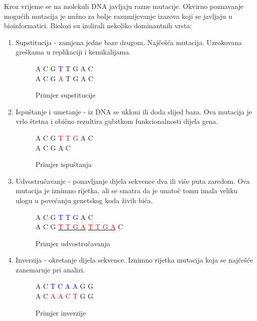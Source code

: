 \documentclass[times, utf8, diplomski]{fer}
\begin{document}
Kroz vrijeme se na molekuli DNA javljaju razne mutacije. Okvirno poznavanje mogućih mutacija je nužno za bolje razumijevanje izazova koji se javljaju u bioinformatici. Biolozi su izolirali nekoliko dominantnih vrsta:

\begin{enumerate}
\item Supstitucija - zamjena jedne baze drugom. Najčešća mutacija.
  Uzrokovana greškama u replikaciji i kemikalijama.
  \nopagebreak
  \begin{figure}[!ht]
    \begin{center}
      A C G \textcolor{blue}{T} T G A C \\
      A C G \textcolor{red}{A} T G A C
      \caption{Primjer supstitucije}
    \end{center}
  \end{figure}

\item Ispuštanje i umetanje - iz DNA se ukloni ili doda slijed baza. Ova mutacija je vrlo štetna i obično
  rezultira gubitkom funkcionalnosti dijela gena.

  \nopagebreak
  \begin{figure}[!ht]
    \begin{center}
      A C G \textcolor{red}{T T G} A C \\
      A C G A C
      \caption{Primjer ispuštanja}
    \end{center}
  \end{figure}
\item Udvostručavanje - ponavljanje dijela sekvence dva ili više puta zaredom. Ova mutacija je iznimno rijetka,
  ali se smatra da je unatoč tomu imala veliku ulogu u povećanju genetskog koda živih bića.
  \begin{figure}[!ht]
    \begin{center}
      A C G \textcolor{blue}{T T G A} C \\
      A C G \underline{\textcolor{red}{T T G A}} \underline{\textcolor{red}{T T G A}} C \\
      \caption{Primjer udvostručavanja}
    \end{center}
  \end{figure}
  
\item Inverzija - okretanje dijela sekvence. Iznimno rijetka mutacija koja se najčešće zanemaruje pri analizi.
  \begin{figure}[!ht]
    \begin{center}
      A C \textcolor{blue}{T C A A} G G \\
      A C \textcolor{red} {A A C T} G G
      \caption{Primjer inverzije}
    \end{center}
\end{figure}
\end{enumerate}
\end{document}
